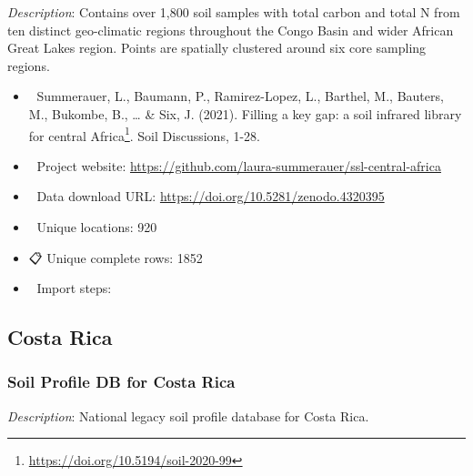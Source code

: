 \documentclass[
  graybox,natbib,nospthms]{svmono}
\providecommand{\tightlist}{%
  \setlength{\itemsep}{0pt}\setlength{\parskip}{0pt}}
\providecommand{\tightlist}{\setlength{\itemsep}{0pt}\setlength{\parskip}{0pt}}
\renewcommand{\href}[2]{#2 (\url{#1})}
\renewcommand{\href}[2]{#2\footnote{\url{#1}}}
\begin{document}
\emph{Description}: Contains over 1,800 soil samples with total carbon and total N from ten distinct geo-climatic regions throughout the Congo Basin and wider African Great Lakes region. Points are spatially clustered around six core sampling regions.

\begin{itemize}
\tightlist
\item
  📕 Summerauer, L., Baumann, P., Ramirez-Lopez, L., Barthel, M., Bauters, M., Bukombe, B., \ldots{} \& Six, J. (2021). \href{https://doi.org/10.5194/soil-2020-99}{Filling a key gap: a soil infrared library for central Africa}. Soil Discussions, 1-28.\\
\item
  🔗 Project website: \url{https://github.com/laura-summerauer/ssl-central-africa}\\
\item
  📂 Data download URL: \url{https://doi.org/10.5281/zenodo.4320395}\\
\item
  📍 Unique locations: 920\\
\item
  📋 Unique complete rows: 1852\\
\item
  📝 Import steps:
\end{itemize}

\hypertarget{costa-rica}{%
\subsection{Costa Rica}\label{costa-rica}}

\hypertarget{soil-profile-db-for-costa-rica}{%
\subsubsection{Soil Profile DB for Costa Rica}\label{soil-profile-db-for-costa-rica}}

\emph{Description}: National legacy soil profile database for Costa Rica.
\end{document}
